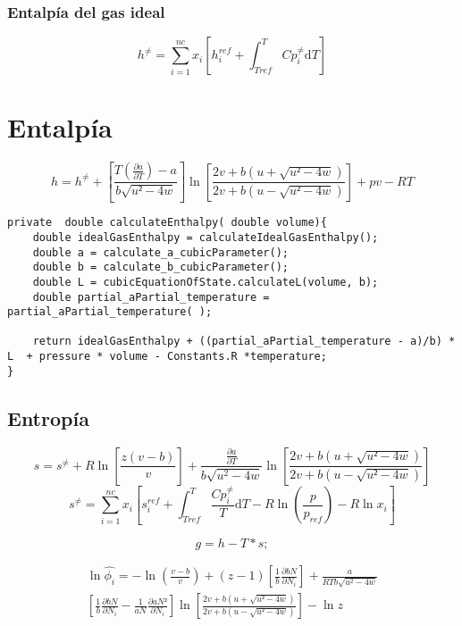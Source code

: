 \subsubsection{Entalpía del gas ideal}
\begin{equation}\label{eq:idealgasenthalpy}
h^{\neq} = \sum_{i=1}^{nc} x_i \left[ h_i^{ref} + \int_{Tref}^{T} Cp_i^{\neq} \mathrm{d}T \right]
\end{equation}

\section{Entalpía}
\begin{equation}\label{eq:enthalpy}
h = h^{\neq} + \left[ \frac{T(\frac{\partial a}{\partial T}) - a}{b\sqrt{u²-4w} }\right] 
\ln\left[\frac{2v+b\left(u + \sqrt{u²-4w}\right)}{2v+b\left(u - \sqrt{u²-4w}\right)}\right]
+ pv - RT
\end{equation}

\begin{lstlisting}[label=some-code,caption=Some Code]
private  double calculateEnthalpy( double volume){
    double idealGasEnthalpy = calculateIdealGasEnthalpy();
    double a = calculate_a_cubicParameter();
    double b = calculate_b_cubicParameter();
    double L = cubicEquationOfState.calculateL(volume, b);
    double partial_aPartial_temperature = partial_aPartial_temperature( );
    
    return idealGasEnthalpy + ((partial_aPartial_temperature - a)/b) * L  + pressure * volume - Constants.R *temperature;
}
\end{lstlisting}	



\subsection{Entropía}
\begin{equation}\label{eq:entropy}
s = s^{\neq} + R\ln\left[\frac{z(v-b)}{v}\right] + \frac{\frac{\partial a}{\partial T}}{b \sqrt{u^2 - 4w}}
\ln\left[\frac{2v+b\left(u + \sqrt{u²-4w}\right)}{2v+b\left(u - \sqrt{u²-4w}\right)}\right]
\end{equation}
\begin{equation}\label{eq:idealgasentropy}
s^{\neq} = \sum_{i=1}^{nc} x_i\left[s_i^{ref} + \int_{Tref}^T \frac{Cp_i^{\neq}}{T} \mathrm{d}T 
- R\ln \left(\frac{p}{p_{ref}}\right)- R\ln{x_i}
\right]
\end{equation}


\begin{equation}\label{eq:gibbs}
g = h - T * s;
\end{equation}


\begin{multline}\label{eq:fugacity}
\ln\hat{\phi_i} = - \ln\left(\frac{v-b}{v}\right) 
+ (z-1)\left[\frac{1}{b}\frac{\partial bN}{\partial N_i}\right]
+ \frac{a}{RTb\sqrt{u^2-4w}}
\\
\left[\frac{1}{b}\frac{\partial bN}{\partial N_i}
- \frac{1}{aN}\frac{\partial aN²}{\partial N_i}\right]
\ln\left[\frac{2v+b\left(u + \sqrt{u²-4w}\right)}{2v+b\left(u - \sqrt{u²-4w}\right)}\right]
-\ln{z}
\end{multline}